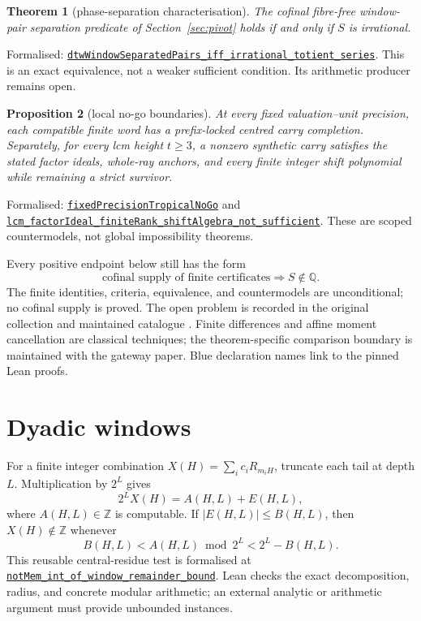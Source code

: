 \documentclass[11pt]{article}
\newcommand{\commit}{81150c1c6fdd4cd51e76d3aa0de344341e0e9e7c}
\newcommand{\repobase}{https://github.com/wcook04/plectis-lean-erdos249-257/blob/\commit}
\newcommand{\PK}{Erdos249257}
\newcommand{\lref}[3]{\href{\repobase/\PK/#1\#L#2}{\nolinkurl{#3}}}
\newtheorem{theorem}{Theorem}[section]
\newtheorem{proposition}[theorem]{Proposition}
\theoremstyle{remark}\newtheorem*{remark}{Remark}
\newcommand{\Z}{\mathbb Z}
\begin{document}
\begin{theorem}[phase-separation characterisation]\label{thm:phase}
The cofinal fibre-free window-pair separation predicate of
Section~\ref{sec:pivot} holds if and only if \(S\) is irrational.
\end{theorem}
\noindent Formalised:
\lref{PivotAntiReconstruction.lean}{1744}{dtwWindowSeparatedPairs_iff_irrational_totient_series}.
This is an exact equivalence, not a weaker sufficient condition.  Its
arithmetic producer remains open.

\begin{proposition}[local no-go boundaries]\label{prop:nogo}
At every fixed valuation--unit precision, each compatible finite word has a
prefix-locked centred carry completion.  Separately, for every lcm height
\(t\ge3\), a nonzero synthetic carry satisfies the stated factor ideals,
whole-ray anchors, and every finite integer shift polynomial while remaining
a strict survivor.
\end{proposition}
\noindent Formalised:
\lref{TropicalCurvatureCarry.lean}{137}{fixedPrecisionTropicalNoGo} and
\lref{LcmFactorIdealPulseObstruction.lean}{798}{lcm_factorIdeal_finiteRank_shiftAlgebra_not_sufficient}.
These are scoped countermodels, not global impossibility theorems.

Every positive endpoint below still has the form
\[
 \text{cofinal supply of finite certificates}\Longrightarrow S\notin\mathbb Q.
\]
The finite identities, criteria, equivalence, and countermodels are
unconditional; no cofinal supply is proved.  The open problem is recorded in
the original collection and maintained catalogue
\cite{erdosgraham1980,erdosproblems}.  Finite differences and affine moment
cancellation are classical techniques; the theorem-specific comparison
boundary is maintained with the gateway paper.  Blue declaration names link
to the pinned Lean proofs.

\section{Dyadic windows}\label{sec:windows}
For a finite integer combination $X(H)=\sum_i c_iR_{m_iH}$, truncate each
tail at depth $L$.  Multiplication by $2^L$ gives
\[
 2^LX(H)=A(H,L)+E(H,L),
\]
where $A(H,L)\in\Z$ is computable.  If $|E(H,L)|\le B(H,L)$, then
$X(H)\notin\Z$ whenever
\[
 B(H,L)<A(H,L)\bmod2^L<2^L-B(H,L).
\]
This reusable central-residue test is formalised at
\lref{PrimeJumpWindow.lean}{53}{notMem_int_of_window_remainder_bound}.
Lean checks the exact decomposition, radius, and concrete modular arithmetic;
an external analytic or arithmetic argument must provide unbounded instances.
\end{document}
